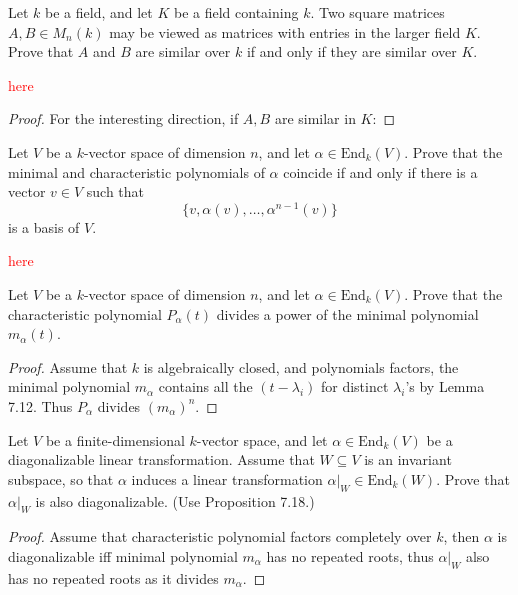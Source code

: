 \documentclass[openany]{book}
\begin{document}
\begin{prob}[7.4]
    Let \(k\) be a field, and let \(K\) be a field containing \(k\). Two square matrices \(A, B \in M_n(k)\) may be viewed as matrices with entries in the larger field \(K\). Prove that \(A\) and \(B\) are similar over \(k\) if and only if they are similar over \(K\).
\end{prob}
\textcolor{red}{here}
\begin{proof}
    For the interesting direction, if $A,B$ are similar in $K$: 
\end{proof}

\begin{prob}[7.7]
    Let \( V \) be a \( k \)-vector space of dimension \( n \), and let \( \alpha \in \text{End}_k(V) \). Prove that the minimal and characteristic polynomials of \( \alpha \) coincide if and only if there is a vector \( v \in V \) such that  
    \[ \{v, \alpha(v), \dots, \alpha^{n-1}(v)\} \] 
is a basis of \( V \).
\end{prob}
\textcolor{red}{here}



\begin{prob}[7.8]
    Let \( V \) be a \( k \)-vector space of dimension \( n \), and let \( \alpha \in \text{End}_k(V) \). Prove that the characteristic polynomial \( P_\alpha(t) \) divides a power of the minimal polynomial \( m_\alpha(t) \).
\end{prob}
\begin{proof}
    Assume that $k$ is algebraically closed, and polynomials factors, the minimal polynomial $m_\alpha$ contains all the $(t-\lambda_i)$ for distinct $\lambda_i$'s by Lemma 7.12. Thus $P_\alpha$ divides $(m_\alpha)^n$.
\end{proof}

\begin{prob}[7.12]
    Let \( V \) be a finite-dimensional \( k \)-vector space, and let \( \alpha \in \text{End}_k(V) \) be a diagonalizable linear transformation. Assume that \( W \subseteq V \) is an invariant subspace, so that \( \alpha \) induces a linear transformation \( \alpha|_W \in \text{End}_k(W) \). Prove that \( \alpha|_W \) is also diagonalizable. (Use Proposition 7.18.)
\end{prob}
\begin{proof}
    Assume that characteristic polynomial factors completely over $k$, then $\alpha$ is diagonalizable iff minimal polynomial $m_\alpha$ has no repeated roots, thus $\alpha\vert_W$ also has no repeated roots as it divides $m_\alpha$.
\end{proof}
\end{document}
